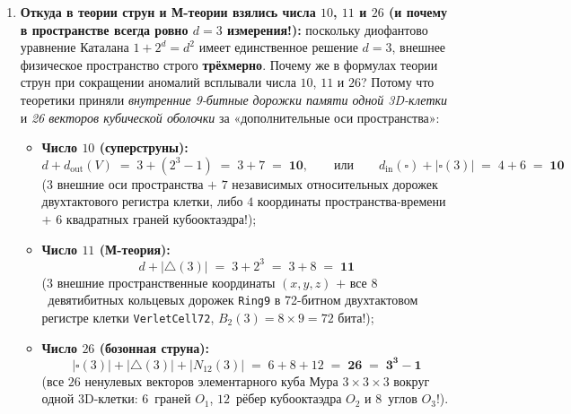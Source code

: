 \begin{enumerate}[label=\textbf{\arabic*.},leftmargin=*]
\begin{itemize}[noitemsep]
    пусть межканальная наводка и примеси в приборе задаются строго треугольным иерархическим оператором возмущения $N_{\mathrm{pert}}$ по $d = 3$ пространственным слоям ($N_{\mathrm{pert}}^3 \equiv 0$). Тогда бесконечный ряд теории возмущений Неймана $(I + N_{\mathrm{pert}})^{-1} = \sum_{k=0}^\infty (-1)^k N_{\mathrm{pert}}^k$ \textbf{обрывается навсегда на втором порядке}:
    \[
      \mathcal{K}_{\mathrm{cal}} \;=\; (I + N_{\mathrm{pert}})^{-1} \;\equiv\; \mathbf{I \;-\; N_{\mathrm{pert}} \;+\; N_{\mathrm{pert}}^2},
    \]
    восстанавливая невозмущённый сигнал прибора $(s_0,s_1,s_2)$ \textbf{без единого деления и с нулевой ошибкой усечения}!
  \end{itemize}
\item \textbf{Откуда в теории струн и М-теории взялись числа $10$, $11$ и $26$ (и почему в пространстве всегда ровно $d = 3$ измерения!):}
  поскольку диофантово уравнение Каталана $1 + 2^d = d^2$ имеет единственное решение $d = 3$, внешнее физическое пространство строго \textbf{трёхмерно}. Почему же в формулах теории струн при сокращении аномалий всплывали числа $10$, $11$ и $26$? Потому что теоретики приняли \emph{внутренние 9-битные дорожки памяти одной 3D-клетки} и \emph{26 векторов кубической оболочки} за «дополнительные оси пространства»:
  \begin{itemize}[noitemsep]
  \item \textbf{Число $10$ (суперструны):}
    \[
      d + d_{\mathrm{out}}(V) \;=\; 3 + (2^3 - 1) \;=\; 3 + 7 \;=\; \mathbf{10},
      \qquad\text{или}\qquad
      d_{\mathrm{in}}(\square) + |\square(3)| \;=\; 4 + 6 \;=\; \mathbf{10}
    \]
    ($3$ внешние оси пространства $+$ $7$ независимых относительных дорожек двухтактового регистра клетки, либо $4$ координаты пространства-времени $+$ $6$ квадратных граней кубооктаэдра!);
  \item \textbf{Число $11$ (М-теория):}
    \[
      d + |{\triangle}(3)| \;=\; 3 + 2^3 \;=\; 3 + 8 \;=\; \mathbf{11}
    \]
    ($3$ внешние пространственные координаты $(x,y,z)$ $+$ все $8$~девятибитных кольцевых дорожек \texttt{Ring9} в 72-битном двухтактовом регистре клетки \texttt{VerletCell72}, $B_2(3) = 8\times 9 = 72\text{ бита}$!);
  \item \textbf{Число $26$ (бозонная струна):}
    \[
      |\square(3)| + |{\triangle}(3)| + |N_{12}(3)| \;=\; 6 + 8 + 12 \;=\; \mathbf{26 \;=\; 3^3 - 1}
    \]
    (все $26$ ненулевых векторов элементарного куба Мура $3\times 3\times 3$ вокруг одной 3D-клетки: $6$~граней $O_1$, $12$~рёбер кубооктаэдра $O_2$ и $8$~углов $O_3$!).
  \end{itemize}

\end{enumerate}
